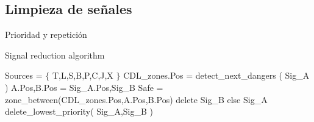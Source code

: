 \subsection{Limpieza de señales}

Prioridad y repetición
\lipsum[1]

\begin{algorithm}[hbt!]
        \caption{Signal reduction algorithm}\label{alg:reduction}
        \DontPrintSemicolon
        \SetNoFillComment
        \LinesNotNumbered 
        Sources = $\{$ T,L,S,B,P,C,J,X $\}$\;
        {
            {
             CDL\_zones.Pos = detect\_next\_dangers ( Sig\_A )\;
             A.Pos,B.Pos = Sig\_A.Pos,Sig\_B\;
             Safe = zone\_between(CDL\_zones.Pos,A.Pos,B.Pos)\;
                 {
                    {
                        {
                            {
                                {
                                    {
                                        delete Sig\_B  else Sig\_A
                                    }
                                }
                            }
                        }
                        {
                            delete\_lowest\_priority( Sig\_A,Sig\_B )\;
                        }
                    }
                }
            }
        }
        \KwResult{[Signals]} 
    \end{algorithm}

    \lipsum[1-3]